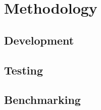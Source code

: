 \chapter{Methodology}
\lorem{}

\section{Development}
\lorem{}

\section{Testing}
\lorem{}

\section{Benchmarking}
\lorem{}
